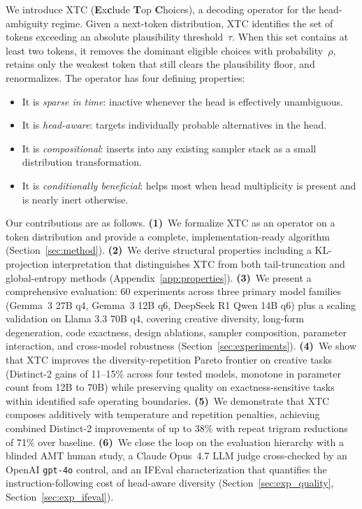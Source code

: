 \documentclass{article}
\newcommand{\xtc}{\textsc{XTC}}
\begin{document}
We introduce \xtc{} (\textbf{E}x\textbf{c}lude \textbf{T}op \textbf{C}hoices), a decoding operator for the head-ambiguity regime.
Given a next-token distribution, \xtc{} identifies the set of tokens exceeding an absolute plausibility threshold~$\tau$.
When this set contains at least two tokens, it removes the dominant eligible choices with probability~$\rho$, retains only the weakest token that still clears the plausibility floor, and renormalizes.
The operator has four defining properties:
\begin{itemize}[leftmargin=1.25em,nosep]
\item It is \emph{sparse in time}: inactive whenever the head is effectively unambiguous.
\item It is \emph{head-aware}: targets individually probable alternatives in the head.
\item It is \emph{compositional}: inserts into any existing sampler stack as a small distribution transformation.
\item It is \emph{conditionally beneficial}: helps most when head multiplicity is present and is nearly inert otherwise.
\end{itemize}

Our contributions are as follows.
\textbf{(1)}~We formalize \xtc{} as an operator on a token distribution and provide a complete, implementation-ready algorithm (Section~\ref{sec:method}).
\textbf{(2)}~We derive structural properties including a KL-projection interpretation that distinguishes \xtc{} from both tail-truncation and global-entropy methods (Appendix~\ref{app:properties}).
\textbf{(3)}~We present a comprehensive evaluation: 60 experiments across three primary model families (Gemma~3 27B q4, Gemma~3 12B q6, DeepSeek R1 Qwen 14B q6) plus a scaling validation on Llama 3.3 70B q4, covering creative diversity, long-form degeneration, code exactness, design ablations, sampler composition, parameter interaction, and cross-model robustness (Section~\ref{sec:experiments}).
\textbf{(4)}~We show that \xtc{} improves the diversity-repetition Pareto frontier on creative tasks (Distinct-2 gains of 11--15\% across four tested models, monotone in parameter count from 12B to 70B) while preserving quality on exactness-sensitive tasks within identified safe operating boundaries.
\textbf{(5)}~We demonstrate that \xtc{} composes additively with temperature and repetition penalties, achieving combined Distinct-2 improvements of up to 38\% with repeat trigram reductions of 71\% over baseline.
\textbf{(6)}~We close the loop on the evaluation hierarchy with a blinded AMT human study, a Claude Opus~4.7 LLM judge cross-checked by an OpenAI \texttt{gpt-4o} control, and an IFEval characterization that quantifies the instruction-following cost of head-aware diversity (Section~\ref{sec:exp_quality}, Section~\ref{sec:exp_ifeval}).
\end{document}
